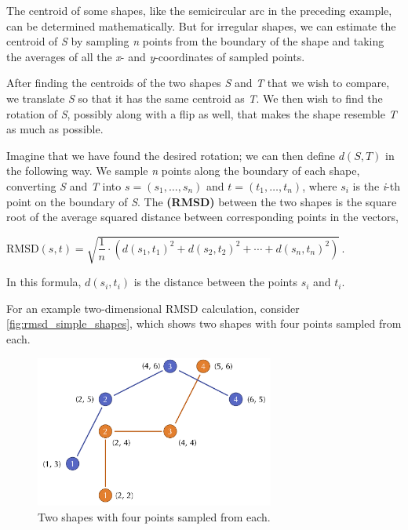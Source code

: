 The centroid of some shapes, like the semicircular arc in the preceding example, can be determined mathematically. But for irregular shapes, we can estimate the centroid of \textit{S} by sampling \textit{n} points from the boundary of the shape and taking the averages of all the \textit{x}- and \textit{y}-coordinates of sampled points.

After finding the centroids of the two shapes \textit{S} and \textit{T} that we wish to compare, we translate \textit{S} so that it has the same centroid as \textit{T}. We then wish to find the rotation of \textit{S}, possibly along with a flip as well, that makes the shape resemble \textit{T} as much as possible.

Imagine that we have found the desired rotation; we can then define $d(S, T)$ in the following way. We sample \textit{n} points along the boundary of each shape, converting \textit{S} and \textit{T} into  $s = (s_{1}, \ldots, s_{n})$ and $t = (t_{1}, \ldots, t_{n})$, where $s_{i}$ is the \textit{i}-th point on the boundary of \textit{S}. The  \textbf{(RMSD)} between the two shapes is the square root of the average squared distance between corresponding points in the vectors,

\begin{center}
$\text{RMSD}(s, t) = \sqrt{\dfrac{1}{n} \cdot \left(d(s_1, t_1)^2 + d(s_2, t_2)^2 + \cdots + d(s_n, t_n)^2\right)}\,. $
\end{center}

In this formula, $d(s_{i}, t_{i})$ is the distance between the points $s_{i}$ and $t_{i}$.

\begin{note}\end{note}

For an example two-dimensional RMSD calculation, consider \autoref{fig:rmsd_simple_shapes}, which shows two shapes with four points sampled from each.\\

\begin{figure}[h]
	\centering
	\mySfFamily
	\includegraphics[width = 0.7\textwidth]{../images/rmsd_simple_shapes.png}
	\caption{Two shapes with four points sampled from each.}
	\label{fig:rmsd_simple_shapes}
\end{figure}

